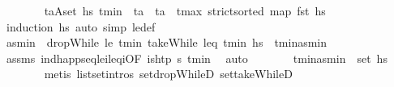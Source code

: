 \begin{isabellebody}
\ \ \ \ \ \ \isamarkupfalse%
\ {\isacartoucheopen}{\isasymforall}{\isacharparenleft}{\kern0pt}t\isactrlsub a{\isacharcomma}{\kern0pt}A{\isacharparenright}{\kern0pt}{\isasymin}set\ hs{\isachardot}{\kern0pt}\ t\isactrlsub m\isactrlsub i\isactrlsub n\ {\isasymle}\ t\isactrlsub a\ {\isasymand}\ t\isactrlsub a\ {\isasymle}\ t\isactrlsub m\isactrlsub a\isactrlsub x{\isacartoucheclose}\ {\isacartoucheopen}strict{\isacharunderscore}{\kern0pt}sorted\ {\isacharparenleft}{\kern0pt}map\ fst\ hs{\isacharparenright}{\kern0pt}{\isacartoucheclose}\isanewline
\ \ \ \ \ \ \isamarkupfalse%
\ {\isacharparenleft}{\kern0pt}induction\ hs{\isacharparenright}{\kern0pt}\ {\isacharparenleft}{\kern0pt}auto\ simp{\isacharcolon}{\kern0pt}\ le{\isacharunderscore}{\kern0pt}def{\isacharparenright}{\kern0pt}\isanewline
\isanewline
\ \ \ \ \isamarkupfalse%
\ as\isactrlsub m\isactrlsub i\isactrlsub n\ \ {\isachardoublequoteopen}dropWhile\ {\isacharparenleft}{\kern0pt}le\ t\isactrlsub m\isactrlsub i\isactrlsub n{\isacharparenright}{\kern0pt}\ {\isacharparenleft}{\kern0pt}takeWhile\ {\isacharparenleft}{\kern0pt}leq\ t\isactrlsub m\isactrlsub i\isactrlsub n{\isacharparenright}{\kern0pt}\ hs{\isacharparenright}{\kern0pt}\ {\isacharequal}{\kern0pt}\ {\isacharbrackleft}{\kern0pt}{\isacharparenleft}{\kern0pt}t\isactrlsub m\isactrlsub i\isactrlsub n{\isacharcomma}{\kern0pt}as\isactrlsub m\isactrlsub i\isactrlsub n{\isacharparenright}{\kern0pt}{\isacharbrackright}{\kern0pt}{\isachardoublequoteclose}\isanewline
\ \ \ \ \ \ \isamarkupfalse%
\ assms\ ind{\isacharunderscore}{\kern0pt}happ{\isacharunderscore}{\kern0pt}seq{\isacharunderscore}{\kern0pt}le\isactrlsub i{\isacharunderscore}{\kern0pt}leq\isactrlsub i{\isacharbrackleft}{\kern0pt}OF\ {\isacartoucheopen}is{\isacharunderscore}{\kern0pt}htp\ {\isasympi}s\ t\isactrlsub m\isactrlsub i\isactrlsub n{\isacartoucheclose}{\isacharbrackright}{\kern0pt}\ \isamarkupfalse%
\ auto\isanewline
\ \ \ \ \isamarkupfalse%
\ \isamarkupfalse%
\ {\isachardoublequoteopen}{\isacharparenleft}{\kern0pt}t\isactrlsub m\isactrlsub i\isactrlsub n{\isacharcomma}{\kern0pt}as\isactrlsub m\isactrlsub i\isactrlsub n{\isacharparenright}{\kern0pt}\ {\isasymin}\ set\ hs{\isachardoublequoteclose}\isanewline
\ \ \ \ \ \ \isamarkupfalse%
\ {\isacharparenleft}{\kern0pt}metis\ list{\isachardot}{\kern0pt}set{\isacharunderscore}{\kern0pt}intros{\isacharparenleft}{\kern0pt}{}{\isacharparenright}{\kern0pt}\ set{\isacharunderscore}{\kern0pt}dropWhileD\ set{\isacharunderscore}{\kern0pt}takeWhileD{\isacharparenright}{\kern0pt}\isanewline

\end{isabellebody}
